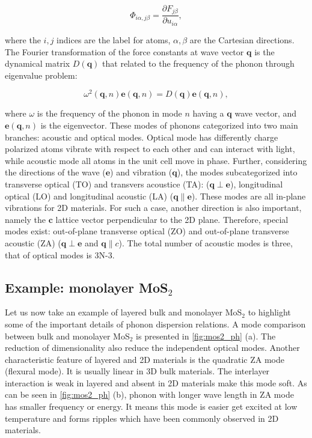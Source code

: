 \begin{equation}
\Phi_{i\alpha,j\beta}= \frac{\partial F_{j\beta}}{\partial u_{i\alpha}},
\end{equation} 

where the $i,j$ indices are the label for atoms, $\alpha,\beta$ are the Cartesian directions. The Fourier transformation of the force constants at wave vector $\mathbf{q}$ is the dynamical matrix $D(\mathbf{q})$ that related to the frequency of the phonon through eigenvalue problem:

\begin{equation}
\omega^2(\mathbf{q},n)\mathbf{e}(\mathbf{q},n)=D(\mathbf{q})\mathbf{e}(\mathbf{q},n),
\end{equation}

where $\omega$ is the frequency of the phonon in mode $n$ having a $\mathbf{q}$ wave vector, and $\mathbf{e}(\mathbf{q},n)$ is the eigenvector\cite{Ackland1997,Parlinski2011}.  These modes of phonons categorized into two main branches: acoustic and optical modes. Optical mode has differently charge polarized atoms vibrate with respect to each other and can interact with light, while acoustic mode all atoms in the unit cell move in phase. Further, considering the directions of the wave ($\mathbf{e}$) and vibration ($\mathbf{q}$), the modes subcategorized into transverse optical (TO) and transvers acoustice (TA): ($\mathbf{q} \perp \mathbf{e}$), longitudinal optical (LO) and longitudinal acoustic (LA) ($\mathbf{q} \parallel \mathbf{e}$). These modes are all in-plane vibrations for 2D materials. For such a case, another direction is also important, namely the $\mathbf{c}$ lattice vector perpendicular to the 2D plane. Therefore, special modes exist: out-of-plane transverse optical (ZO) and out-of-plane transverse acoustic (ZA) ($\mathbf{q} \perp \mathbf{e}$ and $\mathbf{q} \parallel c$). The total number of acoustic modes is three, that of optical modes is 3N-3. 

\subsection{Example: monolayer MoS$_2$}

Let us now take an example of layered bulk and monolayer MoS$_2$ to highlight some of the important details of phonon dispersion relations. A mode comparison between bulk and monolayer MoS$_2$ is presented in \autoref{fig:mos2_ph} (a). The reduction of dimensionality also reduce the independent optical modes. Another characteristic feature of layered and 2D materials is the quadratic ZA mode (flexural mode). It is usually linear in 3D bulk materials. The interlayer interaction is weak in layered and absent in 2D materials make this mode soft. As can be seen in \autoref{fig:mos2_ph} (b), phonon with longer wave length in ZA mode has smaller frequency or energy. It means this mode is easier get excited at low temperature and forms ripples which have been commonly observed in 2D materials. 

